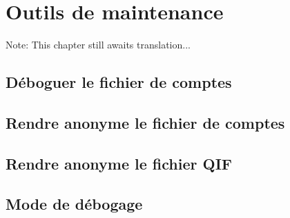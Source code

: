 
\chapter{Outils de maintenance\label{maintenance}}

Note: This chapter still awaits translation...

\section{Déboguer le fichier de comptes\label{maintenance-file-debug}}

\section{Rendre anonyme le fichier de comptes\label{maintenance-file-anonymous}}

 
\section{Rendre anonyme le fichier QIF\label{maintenance-QIF-anonymous}}


\section{Mode de débogage\label{maintenance-debug-mode}}



